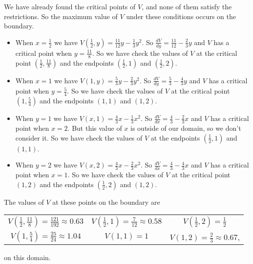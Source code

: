 \begin{exercises}
\begin{exerciseSolution}
	\item We have already found the critical points of $V$, and none of them satisfy the restrictions. So the maximum value of $V$ under these conditions occurs on the boundary. 
\begin{itemize}
\item When $x=\frac{1}{2}$ we have $V\left(\frac{1}{2},y\right) = \frac{11}{12}y - \frac{1}{3}y^2$. So $\frac{dV}{dy} = \frac{11}{12} - \frac{2}{3}y$ and $V$ has a critical point when $y = \frac{11}{8}$. So we have check the values of $V$ at the critical point $\left(\frac{1}{2}, \frac{11}{8}\right)$ and the endpoints $\left(\frac{1}{2},1\right)$ and $\left(\frac{1}{2},2\right)$.
\item When $x=1$ we have $V(1,y) = \frac{5}{3}y - \frac{2}{3}y^2$. So $\frac{dV}{dy} = \frac{5}{3} - \frac{4}{3}y$ and $V$ has a critical point when $y = \frac{5}{4}$. So we have check the values of $V$ at the critical point $\left(1, \frac{5}{4}\right)$ and the endpoints $(1,1)$ and $(1,2)$. 
\item When $y=1$ we have $V(x,1) = \frac{4}{3}x - \frac{1}{3}x^2$. So $\frac{dV}{dx} = \frac{4}{3} - \frac{2}{3}x$ and $V$ has a critical point when $x = 2$. But this value of $x$ is outside of our domain, so we don't consider it. So we have check the values of $V$ at the endpoints $\left(\frac{1}{2},1\right)$ and $(1,1)$. 
\item When $y=2$ we have $V(x,2) = \frac{4}{3}x - \frac{2}{3}x^2$. So $\frac{dV}{dx} = \frac{4}{3} - \frac{4}{3}x$ and $V$ has a critical point when $x = 1$. So we have check the values of $V$ at the critical point $(1,2)$ and the endpoints $\left(\frac{1}{2},2\right)$ and $(1,2)$.
\end{itemize}
The values of $V$ at these points on the boundary are 
\begin{center}
\renewcommand{\arraystretch}{1.25}
\begin{tabular}{ccc}
$V\left(\frac{1}{2}, \frac{11}{8}\right) = \frac{121}{192} \approx 0.63$ &$V\left(\frac{1}{2},1\right) = \frac{7}{12} \approx 0.58$ &$V\left(\frac{1}{2},2\right) = \frac{1}{2}$ \\
$V\left(1, \frac{5}{4}\right) = \frac{25}{24} \approx 1.04$  &$V(1,1) = 1$	&$V(1,2) = \frac{2}{3} \approx 0.67$,\\
\end{tabular}
\end{center}
on this domain.

    \ea
\end{exerciseSolution}


\end{exercises}
